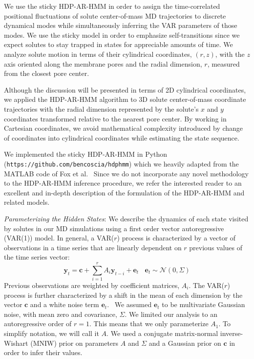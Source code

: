 \documentclass[journal=jpcbfk,manuscript=article]{achemso}
\begin{document}
  We use the sticky HDP-AR-HMM in order to assign the time-correlated positional 
  fluctuations of solute center-of-mass MD trajectories to discrete dynamical modes while 
  simultaneously inferring the VAR parameters of those modes. We use the sticky model
  in order to emphasize self-transitions since we expect solutes to stay trapped in
  states for appreciable amounts of time. We analyze solute motion in terms of their
  cylindrical coordinates, $(r, z)$, with the $z$ axis oriented along the membrane 
  pores and the radial dimension, $r$, measured from the closest pore center. 
  
  Although the discussion will be presented in terms of 2D cylindrical coordinates, we
  applied the HDP-AR-HMM algorithm to 3D solute center-of-mass coordinate trajectories 
  with the radial dimension represented by the solute's $x$ and $y$ coordinates 
  transformed relative to the nearest pore center. By working in Cartesian coordinates,
  we avoid mathematical complexity introduced by change of coordinates into cylindrical
  coordinates while estimating the state sequence.

  We implemented the sticky HDP-AR-HMM in Python 
  (\texttt{https://github.com/bencoscia/hdphmm}) which we heavily adapted from
  the MATLAB code of Fox et al.~\cite{fox_nonparametric_2009} Since we do not incorporate
  any novel methodology to the HDP-AR-HMM inference procedure, we refer the 
  interested reader to an excellent and in-depth description of the formulation of
  the HDP-AR-HMM and related models.~\cite{fox_bayesian_2010}
  
  \textit{Parameterizing the Hidden States}: We describe the dynamics of each 
  state visited by solutes in our MD simulations using a first order vector 
  autoregressive (VAR(1)) model. In general, a VAR($r$) process is characterized by a
  vector of observations in a time series that are linearly dependent on $r$ previous
  values of the time series vector:
  \begin{equation}
  	\mathbf{y}_t = \mathbf{c} + \sum_{i=1}^r A_i\mathbf{y}_{t-i} + \mathbf{e}_t~~~~\mathbf{e}_t \sim \mathcal{N}(0, \Sigma)
  \label{eqn:var}
  \end{equation}
  Previous observations are weighted by coefficient matrices, $A_i$. The VAR($r$) 
  process is further characterized by a shift in the mean of each dimension by the
  vector $\mathbf{c}$ and a white noise term $\mathbf{e}_t$.~\cite{hamilton_time_1994}
  We assumed $\mathbf{e}_t$ to be multivariate Gaussian noise, with mean zero and
  covariance, $\Sigma$. We limited our analysis to an autoregressive order of $r=1$.
  This means that we only parameterize $A_1$. To simplify notation, we will call it $A$. 
  We used a conjugate matrix-normal inverse-Wishart (MNIW) prior on parameters 
  $A$ and $\Sigma$ and a Gaussian prior on $\mathbf{c}$ in order to infer their 
  values.~\cite{fox_nonparametric_2009}
   
\end{document}
